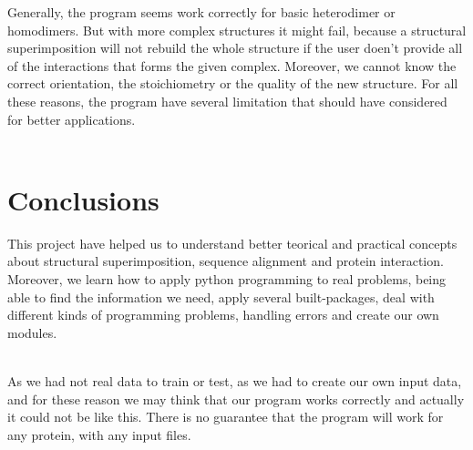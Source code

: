 \documentclass[a4paper,10pt]{report}
\begin{document}
Generally, the program seems work correctly for basic heterodimer or homodimers. But with more complex structures it might fail, because a structural superimposition will not rebuild the whole structure if the user doen't provide all of the interactions that forms the given complex. Moreover, we cannot know the correct orientation, the stoichiometry or the quality of the new structure. For all these reasons, the program have several limitation that should have considered for better applications.\\\\

\chapter{Conclusions}

This project have helped us to understand better teorical and practical concepts about structural superimposition, sequence alignment and protein interaction. Moreover, we learn how to apply python programming to real problems, being able to find the information we need, apply several built-packages, deal with different kinds of programming problems, handling errors and create our own modules. \\\

As we had not real data to train or test, as we had to create our own input data, and for these reason we may think that our program works correctly and actually it could not be like this. There is no guarantee that the program will work for any protein, with any input files.\\\
\end{document}
